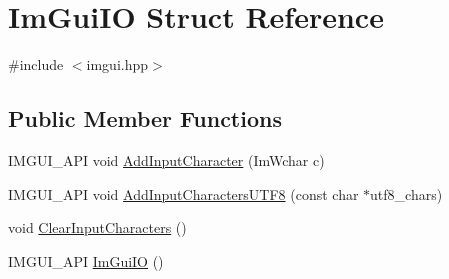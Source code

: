 \hypertarget{struct_im_gui_i_o}{}\section{Im\+Gui\+IO Struct Reference}
\label{struct_im_gui_i_o}


{\ttfamily \#include $<$imgui.\+hpp$>$}

\subsection*{Public Member Functions}
\begin{DoxyCompactItemize}
\item 
I\+M\+G\+U\+I\+\_\+\+A\+PI void \hyperlink{struct_im_gui_i_o_a52b6bdef9278de5ae2031311a269cf14}{Add\+Input\+Character} (Im\+Wchar c)
\item 
I\+M\+G\+U\+I\+\_\+\+A\+PI void \hyperlink{struct_im_gui_i_o_adaf150a1908c02c3cae15a35915bbb26}{Add\+Input\+Characters\+U\+T\+F8} (const char $\ast$utf8\+\_\+chars)
\item 
void \hyperlink{struct_im_gui_i_o_a82d8794e14e628efbb026af4202c70ca}{Clear\+Input\+Characters} ()
\item 
I\+M\+G\+U\+I\+\_\+\+A\+PI \hyperlink{struct_im_gui_i_o_a0ad8d993e50108b81b0d279d2d43f69d}{Im\+Gui\+IO} ()
\end{DoxyCompactItemize}
